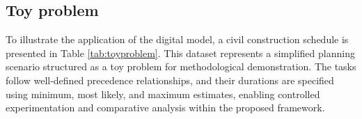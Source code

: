 






\subsection{Toy problem}
To illustrate the application of the digital model, a civil construction schedule is presented in Table \ref{tab:toyproblem}. This dataset represents a simplified planning scenario structured as a toy problem for methodological demonstration. The tasks follow well-defined precedence relationships, and their durations are specified using minimum, most likely, and maximum estimates, enabling controlled experimentation and comparative analysis within the proposed framework.

